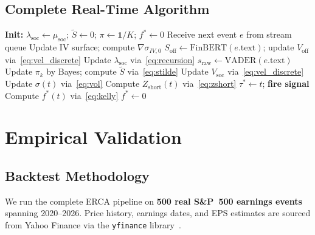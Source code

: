\documentclass[10pt,twocolumn]{article}
\newcommand{\Zshort}{Z_{\mathrm{short}}}
\newcommand{\Stilde}{\tilde{S}}
\newcommand{\lamsoc}{\lambda_{\mathrm{soc}}}
\newcommand{\Soff}{S_{\mathrm{off}}}
\newcommand{\Vsoc}{V_{\mathrm{soc}}}
\newcommand{\Voff}{V_{\mathrm{off}}}
\begin{document}
\subsection{Complete Real-Time Algorithm}

\begin{algorithm}[htbp]
\caption{ERCA Real-Time Pipeline}
\label{alg:erca}
\begin{algorithmic}[1]
\small
\State \textbf{Init:}
  $\lamsoc\leftarrow\mu_{\mathrm{soc}}$;
  $\Stilde\leftarrow0$;
  $\pi\leftarrow\mathbf{1}/K$;
  $f^*\leftarrow0$
  \State Receive next event $e$ from stream queue
    \State Update IV surface; compute $\nabla\sigma_{IV,0}$
    \State $\Soff\leftarrow\mathrm{FinBERT}(e.\text{text})$;
      update $\Voff$ via~\eqref{eq:vel_discrete}
    \State Update $\lamsoc$ via~\eqref{eq:recursion}
    \State $s_{\mathrm{raw}}\leftarrow\mathrm{VADER}(e.\text{text})$
    \State Update $\pi_k$ by Bayes; compute $\Stilde$ via~\eqref{eq:stilde}
    \State Update $\Vsoc$ via~\eqref{eq:vel_discrete}
  \EndIf
  \State Update $\sigma(t)$ via~\eqref{eq:vol}
  \State Compute $\Zshort(t)$ via~\eqref{eq:zshort}
  \If{$\Zshort(t)>\Gamma_{\mathrm{thresh}}$}
    \State $\tau^*\leftarrow t$; \textbf{fire signal}
  \EndIf
  \State Compute $f^*(t)$ via~\eqref{eq:kelly}
    \State $f^*\leftarrow0$ 
  \EndIf
\EndWhile
\end{algorithmic}
\end{algorithm}

\section{Empirical Validation}
\label{sec:empirical}

\subsection{Backtest Methodology}

We run the complete ERCA pipeline on \textbf{500 real S\&P~500 earnings
events} spanning 2020--2026. Price history, earnings dates, and EPS estimates
are sourced from Yahoo Finance via the \texttt{yfinance} library~\cite{yfinance2024}.
\end{document}
